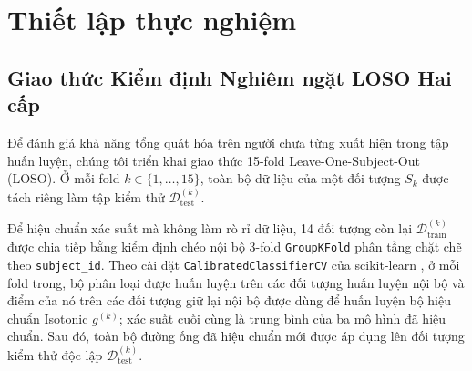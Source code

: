 \documentclass[conference]{IEEEtran}
\begin{document}
\section{Thiết lập thực nghiệm}

\subsection{Giao thức Kiểm định Nghiêm ngặt LOSO Hai cấp}
Để đánh giá khả năng tổng quát hóa trên người chưa từng xuất hiện trong tập huấn luyện, chúng tôi triển khai giao thức 15-fold Leave-One-Subject-Out (LOSO). Ở mỗi fold $k \in \{1, \dots, 15\}$, toàn bộ dữ liệu của một đối tượng $S_k$ được tách riêng làm tập kiểm thử $\mathcal{D}_{\text{test}}^{(k)}$.

Để hiệu chuẩn xác suất mà không làm rò rỉ dữ liệu, 14 đối tượng còn lại $\mathcal{D}_{\text{train}}^{(k)}$ được chia tiếp bằng kiểm định chéo nội bộ 3-fold \texttt{GroupKFold} phân tầng chặt chẽ theo \texttt{subject\_id}. Theo cài đặt \texttt{CalibratedClassifierCV} của scikit-learn \cite{pedregosa2011scikit}, ở mỗi fold trong, bộ phân loại được huấn luyện trên các đối tượng huấn luyện nội bộ và điểm của nó trên các đối tượng giữ lại nội bộ được dùng để huấn luyện bộ hiệu chuẩn Isotonic $g^{(k)}$; xác suất cuối cùng là trung bình của ba mô hình đã hiệu chuẩn. Sau đó, toàn bộ đường ống đã hiệu chuẩn mới được áp dụng lên đối tượng kiểm thử độc lập $\mathcal{D}_{\text{test}}^{(k)}$.
\end{document}
